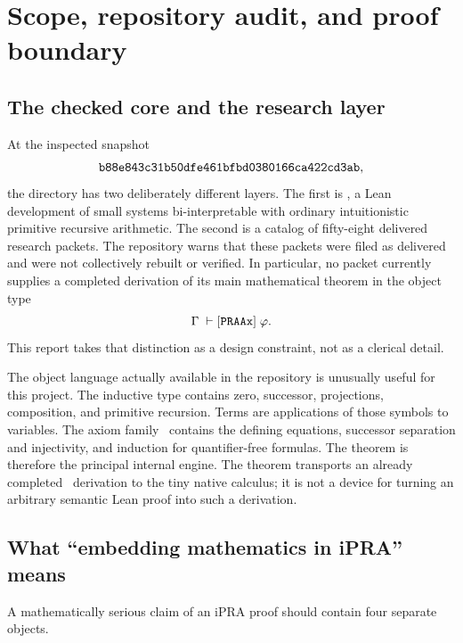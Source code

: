 \section{Scope, repository audit, and proof boundary}

\subsection{The checked core and the research layer}

At the inspected snapshot
\[
  \texttt{b88e843c31b50dfe461bfbd0380166ca422cd3ab},
\]
the directory  has two deliberately
different layers.  The first is , a Lean development of
small systems bi-interpretable with ordinary intuitionistic primitive
recursive arithmetic.  The second is a catalog of fifty-eight delivered
research packets.  The repository warns that these packets were filed as
delivered and were not collectively rebuilt or verified.  In particular, no
packet currently supplies a completed derivation of its main mathematical
theorem in the object type
\[
       \Gamma\;\vdash[\mathtt{PRAAx}]\;\varphi.
\]
This report takes that distinction as a design constraint, not as a clerical
detail.

The object language actually available in the repository is unusually useful
for this project.  The inductive type  contains zero, successor,
projections, composition, and primitive recursion.  Terms  are
applications of those symbols to variables.  The axiom family \PRAAx\ contains
the defining equations, successor separation and injectivity, and induction
for quantifier-free formulas.  The theorem  is therefore the
principal internal engine.  The theorem  transports an
already completed \PRAAx\ derivation to the tiny native calculus; it is not a
device for turning an arbitrary semantic Lean proof into such a derivation.

\subsection{What ``embedding mathematics in iPRA'' means}

A mathematically serious claim of an iPRA proof should contain four separate
objects.

